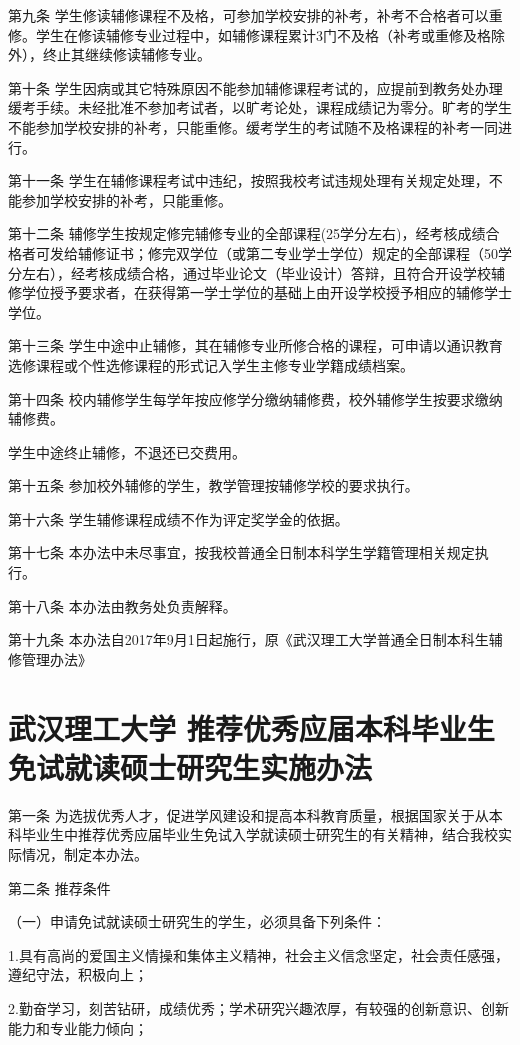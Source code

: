 \documentclass[UTF8,12pt,a4paper]{report}
\begin{document}
第九条  学生修读辅修课程不及格，可参加学校安排的补考，补考不合格者可以重修。学生在修读辅修专业过程中，如辅修课程累计3门不及格（补考或重修及格除外），终止其继续修读辅修专业。

第十条  学生因病或其它特殊原因不能参加辅修课程考试的，应提前到教务处办理缓考手续。未经批准不参加考试者，以旷考论处，课程成绩记为零分。旷考的学生不能参加学校安排的补考，只能重修。缓考学生的考试随不及格课程的补考一同进行。

第十一条  学生在辅修课程考试中违纪，按照我校考试违规处理有关规定处理，不能参加学校安排的补考，只能重修。

第十二条  辅修学生按规定修完辅修专业的全部课程(25学分左右)，经考核成绩合格者可发给辅修证书；修完双学位（或第二专业学士学位）规定的全部课程（50学分左右），经考核成绩合格，通过毕业论文（毕业设计）答辩，且符合开设学校辅修学位授予要求者，在获得第一学士学位的基础上由开设学校授予相应的辅修学士学位。

第十三条  学生中途中止辅修，其在辅修专业所修合格的课程，可申请以通识教育选修课程或个性选修课程的形式记入学生主修专业学籍成绩档案。

第十四条  校内辅修学生每学年按应修学分缴纳辅修费，校外辅修学生按要求缴纳辅修费。

学生中途终止辅修，不退还已交费用。

第十五条  参加校外辅修的学生，教学管理按辅修学校的要求执行。

第十六条  学生辅修课程成绩不作为评定奖学金的依据。

第十七条  本办法中未尽事宜，按我校普通全日制本科学生学籍管理相关规定执行。

第十八条  本办法由教务处负责解释。

第十九条  本办法自2017年9月1日起施行，原《武汉理工大学普通全日制本科生辅修管理办法》

		\chapter{武汉理工大学 推荐优秀应届本科毕业生 免试就读硕士研究生实施办法}
第一条 为选拔优秀人才，促进学风建设和提高本科教育质量，根据国家关于从本科毕业生中推荐优秀应届毕业生免试入学就读硕士研究生的有关精神，结合我校实际情况，制定本办法。

第二条 推荐条件

（一）申请免试就读硕士研究生的学生，必须具备下列条件：

1.具有高尚的爱国主义情操和集体主义精神，社会主义信念坚定，社会责任感强，遵纪守法，积极向上；

2.勤奋学习，刻苦钻研，成绩优秀；学术研究兴趣浓厚，有较强的创新意识、创新能力和专业能力倾向；
\end{document}
